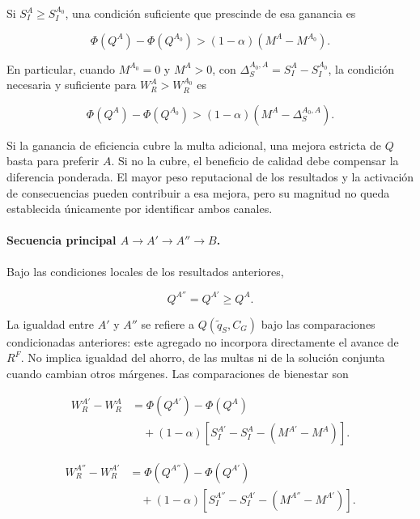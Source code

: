 Si \(S_I^A\geq S_I^{A_0}\), una condición suficiente que prescinde de esa ganancia es

\begin{equation}
\label{eq:condicion_suficiente_bienestar_a_a0}
\Phi(Q^A)-\Phi(Q^{A_0})>(1-\alpha)(M^A-M^{A_0}).
\end{equation}

En particular, cuando \(M^{A_0}=0\) y \(M^A>0\), con \(\Delta_S^{A_0,A}=S_I^A-S_I^{A_0}\), la condición necesaria y suficiente para \(W_R^A>W_R^{A_0}\) es

\begin{equation}
\label{eq:bienestar_a_a0_multa_activada}
\Phi(Q^A)-\Phi(Q^{A_0})>(1-\alpha)(M^A-\Delta_S^{A_0,A}).
\end{equation}

Si la ganancia de eficiencia cubre la multa adicional, una mejora estricta de \(Q\) basta para preferir \(A\). Si no la cubre, el beneficio de calidad debe compensar la diferencia ponderada. El mayor peso reputacional de los resultados y la activación de consecuencias pueden contribuir a esa mejora, pero su magnitud no queda establecida únicamente por identificar ambos canales.

\paragraph{Secuencia principal \(A\to A'\to A''\to B\).}

Bajo las condiciones locales de los resultados anteriores,

\begin{equation}
\label{eq:orden_q_a_ap_app}
Q^{A''}=Q^{A'}\geq Q^A.
\end{equation}

La igualdad entre \(A'\) y \(A''\) se refiere a \(Q(\widetilde q_S,C_G)\) bajo las comparaciones condicionadas anteriores: este agregado no incorpora directamente el avance de \(R^F\). No implica igualdad del ahorro, de las multas ni de la solución conjunta cuando cambian otros márgenes. Las comparaciones de bienestar son

\begin{equation}
\label{eq:bienestar_a_ap}
\begin{aligned}W_R^{A'}-W_R^A&=\Phi(Q^{A'})-\Phi(Q^A)\\&\quad+(1-\alpha)[S_I^{A'}-S_I^A-(M^{A'}-M^A)].\end{aligned}
\end{equation}

\begin{equation}
\label{eq:bienestar_ap_app}
\begin{aligned}W_R^{A''}-W_R^{A'}&=\Phi(Q^{A''})-\Phi(Q^{A'})\\&\quad+(1-\alpha)[S_I^{A''}-S_I^{A'}-(M^{A''}-M^{A'})].\end{aligned}
\end{equation}

